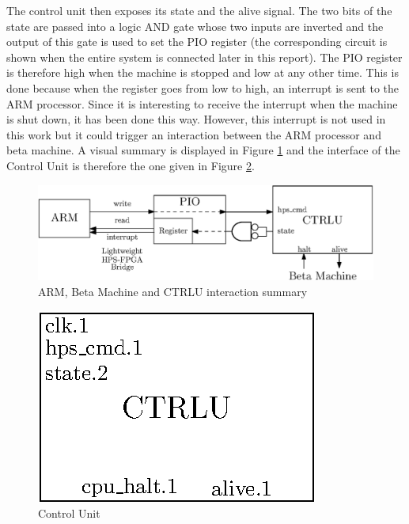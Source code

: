 The control unit then exposes its state and the alive signal. The two bits of the state are passed 
into a logic AND gate whose two inputs are inverted and the output of this gate is used to set the 
PIO register (the corresponding circuit is shown when the entire system is connected later in this 
report). The PIO register is  therefore high when the machine is stopped and low at any other time. 
This is done because when the register goes from low to high, an interrupt is sent to the ARM 
processor. Since it is interesting to receive the interrupt when the machine is shut down, it has been 
done this way. However, this interrupt is not used in this work but it could trigger an interaction between the ARM processor and beta machine. 
A visual summary is displayed in Figure \ref{fig:ctrlu/summary} and the interface of the Control 
Unit is therefore the one given in Figure \ref{fig:ctrlu}.

\begin{figure}[ht!]
    \center
    \includegraphics[scale=0.8]{"Chapter5-MAU_CTRLU/res/ctrlu_summary"}
    \caption{ARM, Beta Machine and CTRLU interaction summary}
    \label{fig:ctrlu/summary}
\end{figure}

\begin{figure}[ht!]
    \center
    \includegraphics[scale=0.8]{"Chapter5-MAU_CTRLU/res/ctrlu"}
    \caption{Control Unit}
    \label{fig:ctrlu}
\end{figure}
